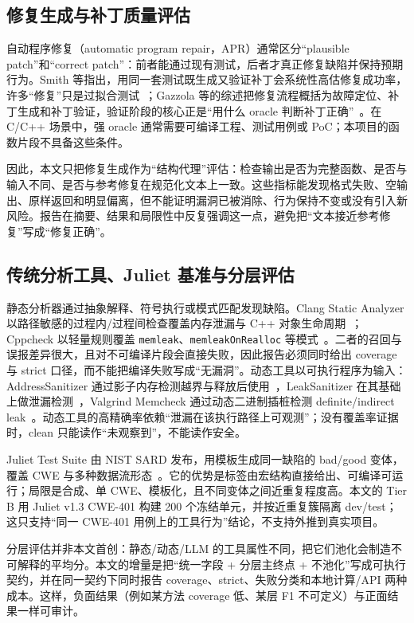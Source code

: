 \documentclass[conference]{IEEEtran}
\begin{document}
\subsection{修复生成与补丁质量评估}
自动程序修复（automatic program repair，APR）通常区分“plausible patch”和“correct patch”：前者能通过现有测试，后者才真正修复缺陷并保持预期行为。Smith 等指出，用同一套测试既生成又验证补丁会系统性高估修复成功率，许多“修复”只是过拟合测试~\cite{smith2015overfitting}；Gazzola 等的综述把修复流程概括为故障定位、补丁生成和补丁验证，验证阶段的核心正是“用什么 oracle 判断补丁正确”~\cite{gazzola2019apr}。在 C/C++ 场景中，强 oracle 通常需要可编译工程、测试用例或 PoC；本项目的函数片段不具备这些条件。

因此，本文只把修复生成作为“结构代理”评估：检查输出是否为完整函数、是否与输入不同、是否与参考修复在规范化文本上一致。这些指标能发现格式失败、空输出、原样返回和明显偏离，但不能证明漏洞已被消除、行为保持不变或没有引入新风险。报告在摘要、结果和局限性中反复强调这一点，避免把“文本接近参考修复”写成“修复正确”。

\subsection{传统分析工具、Juliet 基准与分层评估}
静态分析器通过抽象解释、符号执行或模式匹配发现缺陷。Clang Static Analyzer 以路径敏感的过程内/过程间检查覆盖内存泄漏与 C++ 对象生命周期~\cite{clangsa}；Cppcheck 以轻量规则覆盖 \texttt{memleak}、\texttt{memleakOnRealloc} 等模式~\cite{cppcheck}。二者的召回与误报差异很大，且对不可编译片段会直接失败，因此报告必须同时给出 coverage 与 strict 口径，而不能把编译失败写成“无漏洞”。动态工具以可执行程序为输入：AddressSanitizer 通过影子内存检测越界与释放后使用~\cite{serebryany2012asan}，LeakSanitizer 在其基础上做泄漏检测~\cite{lsan}，Valgrind Memcheck 通过动态二进制插桩检测 definite/indirect leak~\cite{nethercote2007valgrind}。动态工具的高精确率依赖“泄漏在该执行路径上可观测”；没有覆盖率证据时，clean 只能读作“未观察到”，不能读作安全。

Juliet Test Suite 由 NIST SARD 发布，用模板生成同一缺陷的 bad/good 变体，覆盖 CWE 与多种数据流形态~\cite{boland2012juliet,sard}。它的优势是标签由宏结构直接给出、可编译可运行；局限是合成、单 CWE、模板化，且不同变体之间近重复程度高。本文的 Tier B 用 Juliet v1.3 CWE-401 构建 200 个冻结单元，并按近重复簇隔离 dev/test；这只支持“同一 CWE-401 用例上的工具行为”结论，不支持外推到真实项目。

分层评估并非本文首创：静态/动态/LLM 的工具属性不同，把它们池化会制造不可解释的平均分。本文的增量是把“统一字段 + 分层主终点 + 不池化”写成可执行契约，并在同一契约下同时报告 coverage、strict、失败分类和本地计算/API 两种成本。这样，负面结果（例如某方法 coverage 低、某层 F1 不可定义）与正面结果一样可审计。
\end{document}
